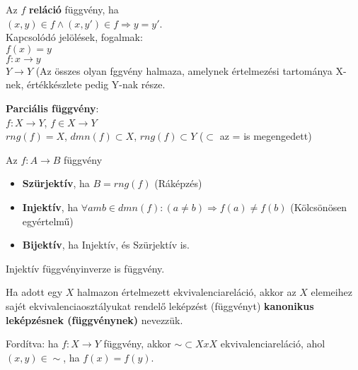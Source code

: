 \documentclass{beamer}
\newcommand{\mmedskip}{\vspace{0.5em}}
\begin{document}
\begin{frame}
\begin{tcolorbox}[title={Def.: Függvény, Parciális függvény}]
Az $f$ \textbf{reláció} függvény, ha\\
$(x, y) \in f \land (x, y') \in f \Rightarrow y = y'$.\\
\tcblower
Kapcsolódó jelölések, fogalmak:\\
$f(x) = y$\\
$f : x \rightarrow y$\\
$Y \rightarrow Y$ (Az összes olyan fggvény halmaza, amelynek értelmezési tartománya X-nek, értékkészlete pedig Y-nak része.\\
\mmedskip

\textbf{Parciális függvény}:\\
$f: X \rightarrow Y$, $f \in X \rightarrow Y$\\
$rng(f) = X$, $dmn(f) \subset X$, $rng(f) \subset Y$ ($\subset$ az = is megengedett)
\end{tcolorbox}

\end{frame}

\begin{frame}

\begin{tcolorbox}[title={Def.: Függvények típusai}]
Az $f: A \rightarrow B$ függvény\\
\begin{itemize}
\item \textbf{Szürjektív}, ha $B = rng(f)$ (Ráképzés)
\item \textbf{Injektív}, ha ${\forall} am b \in dmn(f) : (a \neq b) \Rightarrow f(a) \neq f(b)$ (Kölcsönösen egyértelmű)
\item \textbf{Bijektív}, ha Injektív, és Szürjektív is.
\end{itemize}
\end{tcolorbox}

\begin{tcolorbox}[title={Ész}]
Injektív függvényinverze is függvény.
\end{tcolorbox}

\begin{tcolorbox}[title={Def.: Kanonikus leképzés}]
Ha adott egy $X$ halmazon értelmezett ekvivalenciareláció, akkor az $X$ elemeihez sajét ekvivalenciaosztályukat rendelő leképzést (függvényt) \textbf{kanonikus leképzésnek (függvénynek)} nevezzük.

Fordítva: ha $f: X \rightarrow Y$ függvény, akkor $\sim \subset X x X$ ekvivalenciareláció, ahol $(x, y) \in {\sim}$, ha $f(x) = f(y)$.
\end{tcolorbox}
\end{frame}
\end{document}
